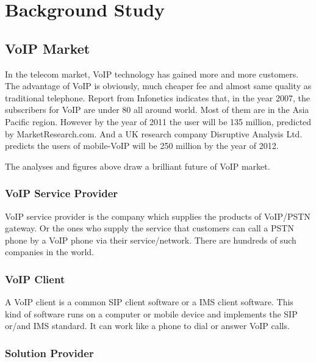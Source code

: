 \chapter{Background Study}
\label{sec:BackgroundStudy}


\section{VoIP Market}
\label{sec:BackgroundStudy:VoIPMarket}

In the telecom market, VoIP technology has gained more and more customers. The advantage of VoIP is obviously, much cheaper fee and almost same quality as traditional telephone.  Report from \textsf{Infonetics} indicates that, in the year 2007, the subscribers for VoIP are under 80 all around world. Most of them are in the Asia Pacific region. However by the year of 2011 the user will be 135 million, predicted by \textsf{MarketResearch.com}. And a UK research company \textsf{Disruptive Analysis Ltd.} predicts the users of mobile-VoIP will be 250 million by the year of 2012.\cite{StateOfTheVoIPMarket2008}

The analyses and figures above draw a brilliant future of VoIP market.  

\subsection{VoIP Service Provider}
\label{sec:BackgroundStudy:VoIPMarket:VoIPServiceProvider}

VoIP service provider is the company which supplies the products of VoIP/PSTN gateway. Or the ones who supply the service that customers can call a PSTN phone by a VoIP phone via their service/network. There are hundreds of such companies in the world. 


\subsection{VoIP Client}
\label{sec:BackgroundStudy:VoIPMarket:VoIPClient}

A VoIP client is a common SIP client software or a IMS client software. This kind of software runs on a computer or mobile device and implements the SIP or/and IMS standard. It can work like a phone to dial or answer VoIP calls.  

\subsection{Solution Provider}
\label{sec:BackgroundStudy:VoIPMarket:SolutionProvider}

